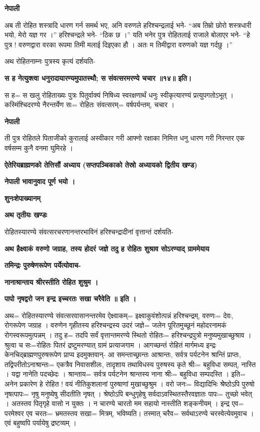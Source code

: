 \documentclass[11pt, a5paper]{article}
\begin{document}
\textbf{नेपाली}

अब ती रोहित शस्त्रादि धारण गर्न समर्थ भए, अनि वरुणले हरिश्चन्द्रलाई भने- “अब तिम्रो छोरो शस्त्रधारी भयो, मेरो यज्ञ गर ।” हरिश्चन्द्रले भने- “ठिक छ ।” यति भनेर पुत्र रोहितलाई राजाले बोलाएर भने- “हे पुत्र ! वरुणद्वारा वरका रूपमा तिमी मलाई दिइएका हौ । अतः म तिमीद्वारा वरुणको यज्ञ गर्दछु ।”

अथ रोहितनाम्नः पुत्रस्य कृत्यं दर्शयति-

\textbf{स ह नेत्युक्त्वा धनुरादायारण्यमुपातस्थौ; स संवत्सरमरण्ये चचार ॥१४॥ इति।}

स ह= स खलु रोहिताख्यः पुत्रः पितुर्वाक्यं निषिध्य स्वरक्षणार्थं धनुः स्वीकृत्यारण्यं प्रत्युपगतोऽभूत् । कस्मिंश्चिदरण्ये नैरन्तर्येण सः= रोहितः संवत्सरम्= वर्षपर्यन्तम्, चचार ।

\textbf{नेपाली}

ती पुत्र रोहितले पिताजीको कुरालाई अस्वीकार गरी आफ्नो रक्षाका निमित्त धनु धारण गरी निरन्तर एक वर्षसम्म कुनै वनमा घुमिरहे ।

\textbf{ऐतेरियब्राह्मणको  तेत्तिसौं अध्याय (सप्तपञ्चिकाको तेस्रो अध्यायको द्वितीय खण्ड)}

\textbf{नेपाली भावानुवाद पूर्ण भयो ।}

\textbf{शुनःशेपाख्यानम्}

\textbf{अथ तृतीयः खण्डः}

रोहितस्यारण्ये संवत्सरचरणानन्तरभाविनं हरिश्चन्द्रादीनां वृत्तान्तं दर्शयति-

\textbf{अथ हैक्ष्वाकं  वरुणो जग्राह, तस्य होदरं जज्ञे तदु ह रोहितः शुश्राव सोऽरण्याद् ग्राममेयाय}

\textbf{तमिन्द्रः पुरुषेणरूपेण पर्येत्योवाच-}

\textbf{नानाश्रान्ताय श्रीरस्तीति रोहित शुश्रुम ।}

\textbf{पापो नृषद्वरो जन इन्द्र इच्चरतः सखा चरैवेति ॥ इति ।}

अथ= रोहितस्यारण्ये संवत्सरवासानन्तरमेव ऐक्ष्वाकम्= इक्ष्वाकुवंशोत्पन्नं हरिश्चन्द्रम्, वरुणः= देवः, रोगरूपेण जग्राह । वरुणेन गृहीतस्य हरिश्चन्द्रस्य उदरं जज्ञे= जलेन पूरितमुच्छूनं  महोदरनामकं रोगस्वरूपमुत्पन्नम् । तदु ह= तदपि सर्वं वृत्तान्तमरण्ये स्थितो रोहितः= हरिश्चन्द्रपुत्रो मनुष्यमुखाच्छुश्राव । श्रुत्वा च सः=रोहितः पितरं द्रष्टुमरण्यात् ग्रामं प्रत्याजगाम । आगच्छन्तं रोहितं मार्गमध्य इन्द्रः केनचिद्‍ब्राह्मणपुरुषरूपेण प्राप्य इदमुक्तवान्- आ समन्ताच्छ्रान्तः आश्रान्तः, सर्वत्र पर्यटनेन श्रान्तिं प्राप्तः, तद्विपरीतोऽनाश्रान्तः= एकत्रैव निवासशीलः, तादृशाय तथाविधस्य पुरुषस्य कृते श्रीः= बहुविधा सम्पत्, नास्ति । यद्वा नानेति पदच्छेदः । श्रान्ताय= सर्वत्र पर्यटनेन श्रान्तस्य नाना श्रीः= बहुविधा सम्पदस्ति । इति= अनेन प्रकारेण हे रोहित ! वयं नीतिकुशलानां पुरुषाणां मुखाच्छुश्रुम । वरो जनः= विद्यादिभिः श्रेेष्ठोऽपि पुरुषो नृषत्पापः= नृषु मनुष्येषु सीदतीति नृ‍षत् । श्रेष्ठोऽपि बन्धुगृहेषु सर्वदाऽवस्थितस्तैरवज्ञातः पापः= तुच्छो भवेत् । अतस्तव पितृगृहे वासो न युक्तः । न चारण्ये चारतो मम सहायो नास्तीति शङ्कनीयम् । इन्द्र एव= परमेश्वर एव चरतः= भ्रमतस्तव सखा= मित्रम्, भविष्यति। तस्मात् चरैव= सर्वथाऽरण्ये चरस्वेत्येवमुवाच । एवं बहुष्वपि पर्यायेषु द्रष्टव्यम् ।
\end{document}
